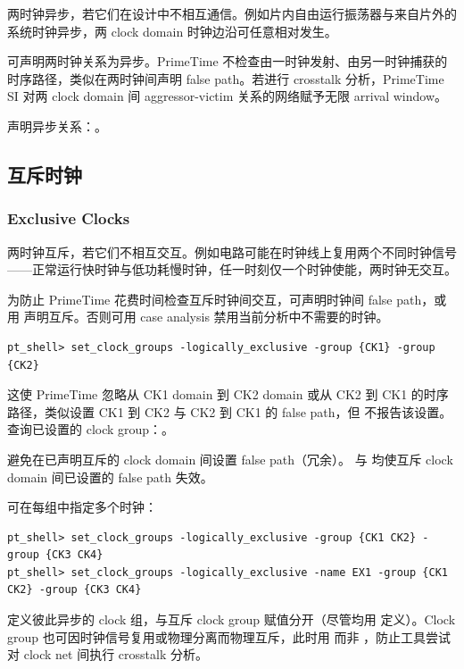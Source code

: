 两时钟异步，若它们在设计中不相互通信。例如片内自由运行振荡器与来自片外的系统时钟异步，两 clock domain 时钟边沿可任意相对发生。

可声明两时钟关系为异步。PrimeTime 不检查由一时钟发射、由另一时钟捕获的时序路径，类似在两时钟间声明 false path。若进行 crosstalk 分析，PrimeTime SI 对两 clock domain 间 aggressor-victim 关系的网络赋予无限 arrival window。

声明异步关系：。

\subsection{互斥时钟}
\subsubsection*{Exclusive Clocks}

两时钟互斥，若它们不相互交互。例如电路可能在时钟线上复用两个不同时钟信号——正常运行快时钟与低功耗慢时钟，任一时刻仅一个时钟使能，两时钟无交互。

为防止 PrimeTime 花费时间检查互斥时钟间交互，可声明时钟间 false path，或用  声明互斥。否则可用 case analysis 禁用当前分析中不需要的时钟。

\begin{lstlisting}
pt_shell> set_clock_groups -logically_exclusive -group {CK1} -group {CK2}
\end{lstlisting}

这使 PrimeTime 忽略从 CK1 domain 到 CK2 domain 或从 CK2 到 CK1 的时序路径，类似设置 CK1 到 CK2 与 CK2 到 CK1 的 false path，但  不报告该设置。查询已设置的 clock group：。

避免在已声明互斥的 clock domain 间设置 false path（冗余）。 与  均使互斥 clock domain 间已设置的 false path 失效。

可在每组中指定多个时钟：
\begin{lstlisting}
pt_shell> set_clock_groups -logically_exclusive -group {CK1 CK2} -group {CK3 CK4}
pt_shell> set_clock_groups -logically_exclusive -name EX1 -group {CK1 CK2} -group {CK3 CK4}
\end{lstlisting}

 定义彼此异步的 clock 组，与互斥 clock group 赋值分开（尽管均用  定义）。Clock group 也可因时钟信号复用或物理分离而物理互斥，此时用  而非 ，防止工具尝试对 clock net 间执行 crosstalk 分析。

